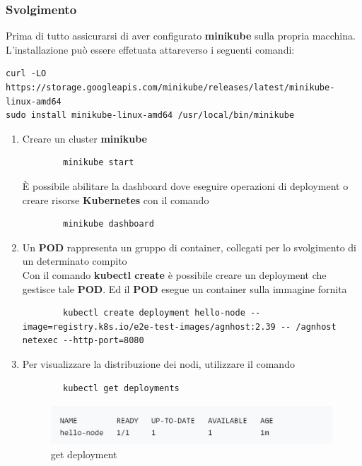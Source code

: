 \documentclass{article}
\begin{document}
\subsubsection{Svolgimento}
Prima di tutto assicurarsi di aver configurato \textbf{minikube} sulla propria macchina. \\
L'installazione può essere effetuata attareverso i seguenti comandi: 
\begin{lstlisting}
curl -LO https://storage.googleapis.com/minikube/releases/latest/minikube-linux-amd64
sudo install minikube-linux-amd64 /usr/local/bin/minikube
\end{lstlisting}
\begin{enumerate}
    \item Creare un cluster \textbf{minikube}
    \begin{lstlisting}
        minikube start
    \end{lstlisting}
    È possibile abilitare la dashboard dove eseguire operazioni di deployment o creare risorse \textbf{Kubernetes} con il comando 
    \begin{lstlisting}
        minikube dashboard
    \end{lstlisting}
    \item Un \textbf{POD} rappresenta un gruppo di container, collegati per lo svolgimento di un determinato compito\\
    Con il comando \textbf{kubectl create}  è possibile creare un deployment che gestisce tale \textbf{POD}. Ed il \textbf{POD} esegue un container sulla immagine fornita
    \begin{lstlisting}
        kubectl create deployment hello-node --image=registry.k8s.io/e2e-test-images/agnhost:2.39 -- /agnhost netexec --http-port=8080
    \end{lstlisting}
    \item Per visualizzare la distribuzione dei nodi, utilizzare il comando
    \begin{lstlisting}
        kubectl get deployments
    \end{lstlisting}
    \begin{figure}[h]
        \centering
\includegraphics{images/output_get_deployment.png}
        \caption{get deployment}
        \label{fig:deployment}
    \end{figure}

\end{enumerate}
\end{document}
